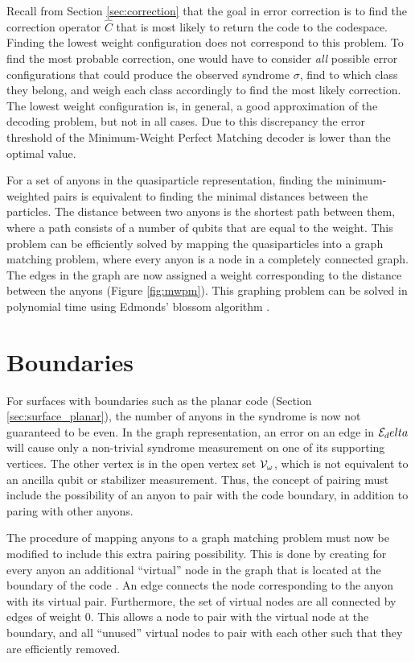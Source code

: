 Recall from Section \ref{sec:correction} that the goal in error correction is to find the correction operator $\hat{C}$ that is most likely to return the code to the codespace. Finding the lowest weight configuration does not correspond to this problem. To find the most probable correction, one would have to consider \emph{all} possible error configurations that could produce the observed syndrome $\sigma$, find to which class they belong, and weigh each class accordingly to find the most likely correction. The lowest weight configuration is, in general, a good approximation of the decoding problem, but not in all cases. Due to this discrepancy the error threshold of the Minimum-Weight Perfect Matching decoder is lower than the optimal value. 

For a set of anyons in the quasiparticle representation, finding the minimum-weighted pairs is equivalent to finding the minimal distances between the particles. The distance between two anyons is the shortest path between them, where a path consists of a number of qubits that are equal to the weight. This problem can be efficiently solved by mapping the quasiparticles into a graph matching problem, where every anyon is a node in a completely connected graph. The edges in the graph are now assigned a weight corresponding to the distance between the anyons (Figure \ref{fig:mwpm}). This graphing problem can be solved in polynomial time using Edmonds' blossom algorithm \cite{edmonds1965paths}. 



\section{Boundaries}\label{sec:mwpmboundaries}

For surfaces with boundaries such as the planar code (Section \ref{sec:surface_planar}), the number of anyons in the syndrome is now not guaranteed to be even. In the graph representation, an error on an edge in $\mathcal{E}_delta$ will cause only a non-trivial syndrome measurement on one of its supporting vertices. The other vertex is in the open vertex set $\mathcal{V}_\omega$, which is not equivalent to an ancilla qubit or stabilizer measurement. Thus, the concept of pairing must include the possibility of an anyon to pair with the code boundary, in addition to paring with other anyons. 

The procedure of mapping anyons to a graph matching problem must now be modified to include this extra pairing possibility. This is done by creating for every anyon an additional ``virtual'' node in the graph that is located at the boundary of the code \cite{wang2011surface}. An edge connects the node corresponding to the anyon with its virtual pair. Furthermore, the set of virtual nodes are all connected by edges of weight 0. This allows a node to pair with the virtual node at the boundary, and all ``unused'' virtual nodes to pair with each other such that they are efficiently removed. 

